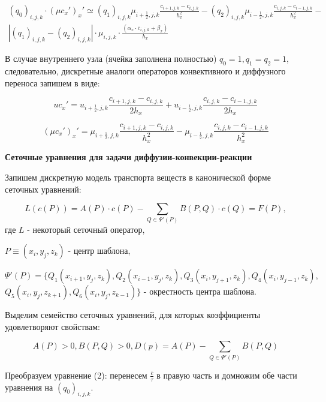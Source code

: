 \documentclass[12pt]{article}
\begin{document}
 \begin{multline*} 
 	(q_0)_{i,j,k}\cdot (\mu c_x')_x'\simeq (q_1)_{i,j,k}\mu _{i+\frac{1}{2},j,k}\frac{c_{i+1,j,k}-c_{i,j,k}}{h_x^2} - (q_2)_{i,j,k}\mu _{i-\frac{1}{2},j,k}\frac{c_{i,j,k}-c_{i-1,j,k}}{h_x^2} - \\
 	|(q_1)_{i,j,k}-(q_2)_{i,j,k}| \cdot \mu_{i,j,k}\cdot \frac{(\alpha_x\cdot\bar{c}_{i,j,k}+\beta_x)}{h_x} 
 \end{multline*} 
 
 В случае внутреннего узла (ячейка заполнена полностью) $q_0=1, q_1=q_2=1$, следовательно, дискретные аналоги  операторов конвективного и диффузного переноса запишем в виде:
 
\begin{equation*}
	uc_x'=u_{i+\frac{1}{2},j,k}\frac{c_{i+1,j,k}-c_{i,j,k}}{2h_x} + u_{i-\frac{1}{2},j,k}\frac{c_{i,j,k}-c_{i-1,j,k}}{2h_x}  
\end{equation*}
 
\begin{equation*}
    (\mu c_x')_x'=\mu_{i+\frac{1}{2},j,k}\frac{c_{i+1,j,k}-c_{i,j,k}}{h_x^2} - \mu_{i-\frac{1}{2},j,k}\frac{c_{i,j,k}-c_{i-1,j,k}}{h_x^2}
\end{equation*}

 \center \textbf  {Сеточные уравнения для задачи диффузии-конвекции-реакции}

Запишем дискретную модель транспорта веществ в канонической форме сеточных уравнений:


\begin{equation}
	L(c(P)) = A(P)\cdot c(P)-\sum_{Q\in \Psi'(P)}B(P,Q)\cdot c(Q) = F(P),
\end{equation}
где $L$ - некоторый сеточный оператор,

$P\equiv(x_i,y_j,z_k)$ - центр шаблона,

$\Psi'(P)=\{Q_1(x_{i+1},y_j,z_k), Q_2(x_{i-1},y_j,z_k), Q_3(x_i,y_{j+1},z_k), Q_4(x_i,y_{j-1},z_k),$ $ Q_5(x_i,y_j,z_{k+1}), Q_6(x_i,y_j,z_{k-1})\} $  - окрестность центра шаблона.

Выделим семейство сеточных уравнений, для которых коэффициенты удовлетворяют свойствам:

\begin{equation}
A(P)>0, B(P,Q)>0, D(p)=A(P) - \sum_{Q\in \Psi'(P)}B(P,Q)   
\end{equation}

\begin{flushleft} Преобразуем уравнение (2):
перенесем $ \frac{\bar{c}}{\tau} $ в правую часть и домножим обе части уравнения на $(q_0)_{i,j,k}$.
\end{flushleft}
\end{document}
